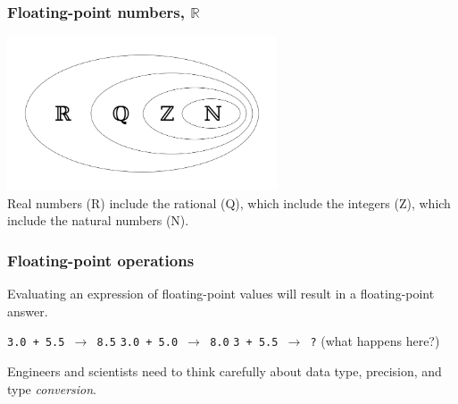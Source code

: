 \documentclass[11pt]{beamer}
\begin{document}
\begin{frame}
  \frametitle{Floating-point numbers, $\mathbb{R}$}
  \Enlarge
  \begin{center}
  \includegraphics[width=0.6\textwidth]{./img/Numbersystems.png}\\
  Real numbers (R) include the rational (Q), which include the integers (Z), which include the natural numbers (N).
  \end{center}
\end{frame}

\begin{frame}
  \frametitle{Floating-point operations}
  \Enlarge

  \begin{itemize}
  \myitem  Evaluating an expression of floating-point values will result in a floating-point answer. \pause
    \begin{itemize}
    \mysubitem  \texttt{3.0 + 5.5 $\rightarrow$ 8.5} \pause
    \mysubitem  \texttt{3.0 + 5.0 $\rightarrow$ 8.0} \pause
    \mysubitem  \texttt{3   + 5.5 $\rightarrow$ ?} (what happens here?)
    \end{itemize} \pause
  \myitem  Engineers and scientists need to think carefully about data type, precision, and type \emph{conversion}.
  \end{itemize}
\end{frame}
\end{document}
